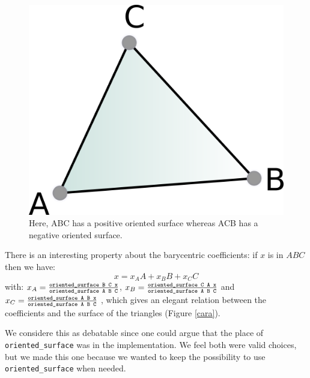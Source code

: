 \documentclass[a4paper,10pt]{article}
\begin{document}
\begin{figure}
  \centering
  \includegraphics{Surface}
  \caption{\label{surface} Here, ABC has a positive oriented surface whereas ACB has a negative oriented surface.}
\end{figure}

 There is an interesting property about the barycentric coefficients: if $x$ is in $ABC$ then we have:
$$x = x_AA + x_BB + x_CC$$
with: $x_A =\frac{ \text{\tt oriented\_surface B C x}}{\text{\tt oriented\_surface A B C}}$,
$x_B =\frac{ \text{\tt oriented\_surface C A x}}{\text{\tt oriented\_surface A B C}}$ and
$x_C =\frac{ \text{\tt oriented\_surface A B x}}{\text{\tt oriented\_surface A B C}}$
, which gives an elegant relation between the coefficients and the surface of the triangles (Figure \ref{cara}).

We considere this as debatable since one could argue that the place of {\tt oriented\_surface} was in the implementation. We feel both were valid choices, but we made this one because we wanted to keep the possibility to use {\tt oriented\_surface} when needed.
\end{document}
